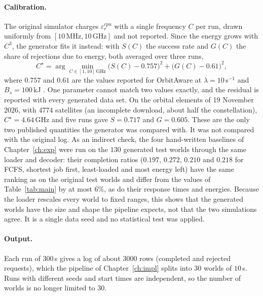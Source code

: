 \paragraph{Calibration.}
The original simulator charges $\varepsilon^{cpu}_r$ with a single frequency $C$ per run, drawn
uniformly from $[10\,\text{MHz}, 10\,\text{GHz}]$ and not reported. Since the energy grows with
$C^3$, the generator fits it instead: with $S(C)$ the success rate and $G(C)$ the share of
rejections due to energy, both averaged over three runs,
\begin{equation}
  C^\star = \arg\min_{C \in [1,10]\,\text{GHz}} \big(S(C) - 0.757\big)^2 + \big(G(C) - 0.61\big)^2 ,
\end{equation}
where $0.757$ and $0.61$ are the values reported for OrbitAware at $\lambda = 10$\,s$^{-1}$ and
$B_s = 100$\,kJ \citep[Section~6.5.1]{magliarisi2026thesis}. One parameter cannot match two
values exactly, and the residual is reported with every generated data set. On the orbital
elements of 19 November 2026, with $4774$ satellites (an incomplete download, about half the
constellation), $C^\star = 4.64$\,GHz and five runs gave $S = 0.717$ and $G = 0.605$. These are
the only two published quantities the generator was compared with. It was not compared with the
original log. As an indirect check, the four hand-written baselines of
Chapter~\ref{ch:exp} were run on the $130$ generated test worlds through the same loader and
decoder: their completion ratios ($0.197$, $0.272$, $0.210$ and $0.218$ for FCFS, shortest job
first, least-loaded and most energy left) have the same ranking as on the original test worlds and
differ from the values of Table~\ref{tab:main} by at most $6\%$, as do their response times and
energies. Because the loader rescales every world to fixed ranges, this shows that the generated
worlds have the size and shape the pipeline expects, not that the two simulations agree. It is a
single data seed and no statistical test was applied.

\paragraph{Output.}
Each run of $300$\,s gives a log of about $3000$ rows (completed and rejected requests), which the
pipeline of Chapter~\ref{ch:impl} splits into $30$ worlds of $10$\,s. Runs with different seeds
and start times are independent, so the number of worlds is no longer limited to $30$.

